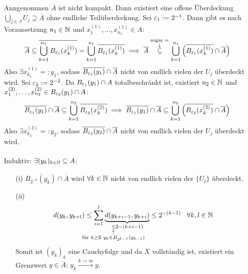 \documentclass[a4paper]{article}
\begin{document}
\begin{Beweis}
Anngenommen $\overline A$ ist nicht kompakt. Dann existiert eine offene Überdeckung $\bigcup_{j\in J}U_j\supseteq \overline A$ ohne endliche Teilüberdeckung. Sei $\operatorname{\varepsilon}_1:=2^{-1}$. Dann gibt es nach Voraussetzung $n_1\in\operatorname{\mathbb N}$ und $x_1^{(1)},\ldots,x_{n_1}^{(1)}\in A$:
\[\overline{A}\subseteq \overline{\bigcup_{k=1}^{n_1}B_{\operatorname{\varepsilon}_1}(x_k^{(1)})}=
\bigcup_{k=1}^{n_1}\overline{B_{\operatorname{\varepsilon}_1}(x_k^{(1)})}
\implies \overline A\overset{\substack{\text{sogar }=\\\downarrow}}{\subseteq} \bigcup_{k=1}^{n_1}\left(\overline{B_{\operatorname{\varepsilon}_1}(x_k^{(1)})}\cap \overline A\right)
\]
Also $\exists x_{k_1}^{(1)}=:y_1$, sodass $\overline{B_{\operatorname{\varepsilon}_1}(y_1)}\cap \overline A$ nicht von endlich vielen der $U_j$ überdeckt wird. Sei $\operatorname{\varepsilon}_2:=2^{-2}$. Da $B_{\operatorname{\varepsilon}_1}(y_1)\cap A$ totalbeschränkt ist, existiert $n_2\in \operatorname{\mathbb N}$ und $x_1^{(2)},\ldots,x_{n_2}^{(2)}\in B_{\operatorname{\varepsilon}_2}(y_1)\cap A$:
\[\overline{B_{\operatorname{\varepsilon}_1}(y_1)}\cap \overline A\subseteq 
\bigcup_{k=1}^{n_2}\overline{B_{\operatorname{\varepsilon}_2}(x_k^{(2)})}
\implies \overline{B_{\operatorname{\varepsilon}_1}(y_1)}\cap \overline A\subseteq \bigcup_{k=1}^{n_2}\left(\overline{B_{\operatorname{\varepsilon}_2}(x_k^{(2)})}\cap \overline A\right)
\]
Also $\exists x_{k_2}^{(2)}=:y_2$, sodass $\overline{B_{\operatorname{\varepsilon}_2}(y_2)}\cap \overline A$ nicht von endlich vielen der $U_j$ überdeckt wird.\\
\ \\
Induktiv: $\exists (y_k)_{k\in\operatorname{\mathbb N}}\subseteq A$:
\begin{itemize}
\item[(i)]$\overline{B_{2^{-k}}(y_k)}\cap \overline A$ wird $\forall k\in\operatorname{\mathbb N}$ nicht von endlich vielen der $\{U_j\}$ überdeckt.
\item[(ii)]\[d(y_k,y_{k+l})\le \sum_{i=1}^l\underbrace{d(y_{k+i-1},y_{k+i})}_{\underset{\mathclap{\substack{\uparrow\\ \text{für }k\ge 2:\, y_k\in B_{2^{k-1}}(y_{k-1})}}}{\le} 2{-(k+i-1)}}\le 2^{-(k-1)}\;\;\;\forall k,l\in\NN\]
Somit ist $(y_k)_k$ eine Cauchyfolge und da $X$ vollständig ist, existiert ein Grenzwert $y\in \overline{A}$: $y_k\xrightarrow{k\to\infty}y$.
\end{itemize}


\end{Beweis}
\end{document}
